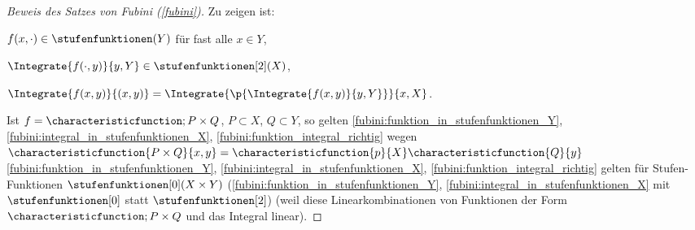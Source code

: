 \begin{proof}[Beweis des Satzes von Fubini (\ref{fubini})]
  Zu zeigen ist:
  \begin{eigenschaftenenumerate}
    \item \label{fubini:funktion_in_stufenfunktionen_Y}\( f(x,\cdot)\in\stufenfunktionen(Y) \) für fast alle \( x\in Y \),
    \item \label{fubini:integral_in_stufenfunktionen_X}\( \Integrate{f(\cdot,y)}{y,Y}\in \stufenfunktionen[2](X) \),
    \item\label{fubini:funktion_integral_richtig} \( \Integrate{f(x,y)}{{(x,y)}}=\Integrate{\p{\Integrate{f(x,y)}{y,Y}}}{x,X} \).
  \end{eigenschaftenenumerate}
  Ist \( f=\characteristicfunction;{P\times  Q} \), \( P\subset X \), \( Q\subset Y \), so gelten \ref{fubini:funktion_in_stufenfunktionen_Y}, \ref{fubini:integral_in_stufenfunktionen_X}, \ref{fubini:funktion_integral_richtig} wegen \( \characteristicfunction{P\times Q}{x,y}=\characteristicfunction{p}{X}\characteristicfunction{Q}{y} \) \timplies \ref{fubini:funktion_in_stufenfunktionen_Y}, \ref{fubini:integral_in_stufenfunktionen_X}, \ref{fubini:funktion_integral_richtig} gelten für Stufen-Funktionen \( \stufenfunktionen[0](X\times Y) \)  (\ref{fubini:funktion_in_stufenfunktionen_Y}, \ref{fubini:integral_in_stufenfunktionen_X} mit \( \stufenfunktionen[0] \) statt \( \stufenfunktionen[2] \)) (weil diese Linearkombinationen von Funktionen der Form \( \characteristicfunction;{P\times Q} \) und das Integral linear).


\end{proof}
